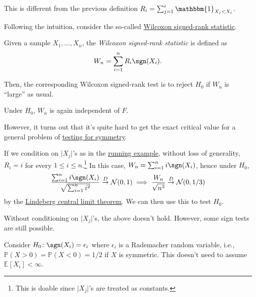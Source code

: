 \begin{prev}
	This is different from the previous definition \(R_i = \sum_{j=1}^{i} \mathbbm{1}_{X_j < X_i} \).
\end{prev}

Following the intuition, consider the so-called \hyperref[def:Wilcoxon-signed-rank-statistic]{Wilcoxon signed-rank statistic}.

\begin{definition}\label{def:Wilcoxon-signed-rank-statistic}
	Given a sample \(X_1, \dots , X_n\), the \emph{Wilcoxon signed-rank statistic} is defined as
	\[
		W_n = \sum_{i=1}^{n} R_i \sgn (X_i).
	\]
\end{definition}

Then, the corresponding Wilcoxon signed-rank test is to reject \(H_0\) if \(W_n\) is ``large'' as usual.

\begin{note}
	Under \(H_0\), \(W_n\) is again independent of \(F\).
\end{note}

However, it turns out that it's quite hard to get the exact critical value for a general problem of \hyperref[prb:testing-symmetry]{testing for symmetry}.

\begin{eg}\label{eg:Wilcoxon-signed-rank-statistic-two-sample-probelm}
	If we condition on \(\vert X_j \vert \)'s as in the \hyperref[eg:two-sample-t-statistic]{running example}, without loss of generality, \(R_i = i\) for every \(1 \leq i \leq n\).\footnote{This is doable since \(\vert X_j \vert \)'s are treated as constants.} In this case, \(W_n = \sum_{i=1}^{n} i \sgn (X_i)\), hence under \(H_0\),
	\[
		\frac{\sum_{i=1}^{n} i \sgn (X_i)}{\sqrt{\sum_{i=1}^{n} i^2} }
		\overset{D}{\to} \mathcal{N} (0, 1)
		\implies \frac{W_n}{\sqrt{n^3} }
		\overset{D}{\to} \mathcal{N} (0, 1 / 3)
	\]
	by the \hyperref[thm:Lindeberg-CLT]{Lindeberg central limit theorem}. We can then use this to test \(H_0\).
\end{eg}

Without conditioning on \(\vert X_j \vert \)'s, the above doesn't hold. However, some sign tests are still possible.

\begin{intuition}
	Consider \(H_0 \colon \sgn (X_i) = \epsilon _i\) where \(\epsilon _i\) is a Rademacher random variable, i.e., \(\mathbb{P} (X > 0) = \mathbb{P} (X < 0) = 1 / 2\) if \(X\) is symmetric. This doesn't need to assume \(\mathbb{E}_{}[X_i] < \infty \).
\end{intuition}

